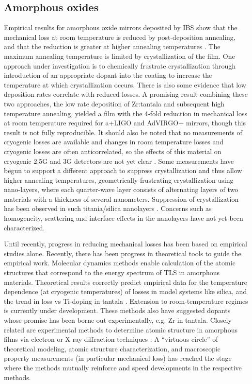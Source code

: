 \subsection{Amorphous oxides}
Empirical results for amorphous oxide mirrors deposited by IBS show that the mechanical loss at room temperature is reduced by post-deposition annealing, and that the reduction is greater at higher annealing temperatures \cite{vajente2018effect}. The maximum annealing temperature is limited by crystallization of the film. One approach under investigation is to chemically frustrate crystallization through introduction of an appropriate dopant into the coating to increase the temperature at which crystallization occurs. There is also some evidence that low deposition rates correlate with reduced losses. A promising result combining these two approaches, the low rate deposition of Zr:tantala and subsequent high temperature annealing, yielded a film with the 4-fold reduction in mechanical loss at room temperature required for a+LIGO and AdVIRGO+ mirrors, though this result is not fully reproducible. It should also be noted that no measurements of cryogenic losses are available and changes in room temperature losses and cryogenic losses are often anticorrelated, so the effects of this material on cryogenic 2.5G and 3G detectors are not yet clear \cite{martin2010effect}. Some measurements have begun to support a different approach to suppress crystallization and thus allow higher annealing temperatures, geometrically frustrating crystallization using nano-layers, where each quarter-wave layer consists of alternating layers of two materials with a thickness of several nanometers. Suppression of crystallization has been observed in such titania/silica nanolayers \cite{pan2014thickness}. Concerns such as homogeneity, scattering and interface effects in the nanolayers have not yet been characterized. 

Until recently, progress in reducing mechanical losses has been based on empirical studies alone. Recently, there has been progress in theoretical tools to guide the empirical work. Molecular dynamics methods enable calculation of the atomic structures that correspond to the energy spectrum of TLS in amorphous materials. Theoretical results correctly predict empirical data for the temperature dependence (at cryogenic temperatures) of losses in model systems like silica, and the trend in loss vs Ti-doping in tantala \cite{trinastic2016molecular}. Extension to room-temperature regimes is currently under development. These methods also have suggested dopants whose promise has been borne out experimentally, e.g. Zr in tantala. Closely related are experimental methods to determine atomic structure in amorphous films via electron or X-ray diffraction techniques \cite{bassiri2013correlations,hart2016medium,shyam2016measurement}. A “virtuous circle” of theoretical modeling, atomic structure characterization, and macroscopic property measurements (in particular mechanical loss) has reached the stage where the methods mutually reinforce and speed developments in the respective methods.

